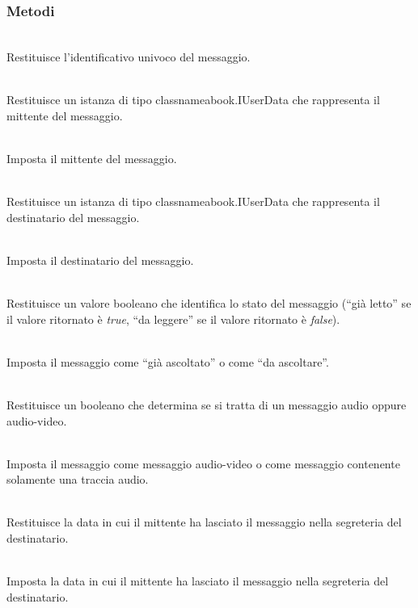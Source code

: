 \subsubsection*{Metodi}
\begin{description}
	\item{}\\
	Restituisce l'identificativo univoco del messaggio.
	\item{}\\
	Restituisce un istanza di tipo classname{abook.IUserData} che rappresenta il mittente del messaggio.
	\item{}\\
	Imposta il mittente del messaggio.
	\item{}\\
	Restituisce un istanza di tipo classname{abook.IUserData} che rappresenta il destinatario del messaggio.
	\item{}\\
	Imposta il destinatario del messaggio.
	\item{}\\
	Restituisce un valore booleano che identifica lo stato del messaggio (``già letto'' se il valore ritornato è \textit{true}, ``da leggere'' se il valore ritornato è \textit{false}).
	\item{}\\
	Imposta il messaggio come ``già ascoltato'' o come ``da ascoltare''.
	\item{}\\
	Restituisce un booleano che determina se si tratta di un messaggio audio oppure audio-video.
	\item{}\\	
	Imposta il messaggio come messaggio audio-video o come messaggio contenente solamente una traccia audio.
	\item{}\\
	Restituisce la data in cui il mittente ha lasciato il messaggio nella segreteria del destinatario.
	\item{}\\
	Imposta la data in cui il mittente ha lasciato il messaggio nella segreteria del destinatario.
\end{description}

